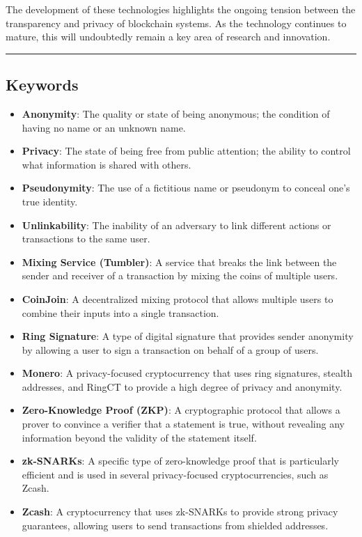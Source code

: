 The development of these technologies highlights the ongoing tension
between the transparency and privacy of blockchain systems. As the
technology continues to mature, this will undoubtedly remain a key area
of research and innovation.

\begin{center}\rule{0.5\linewidth}{0.5pt}\end{center}

\subsection{Keywords}\label{keywords}

\begin{itemize}
\tightlist
\item
  \textbf{Anonymity}: The quality or state of being anonymous; the
  condition of having no name or an unknown name.
\item
  \textbf{Privacy}: The state of being free from public attention; the
  ability to control what information is shared with others.
\item
  \textbf{Pseudonymity}: The use of a fictitious name or pseudonym to
  conceal one's true identity.
\item
  \textbf{Unlinkability}: The inability of an adversary to link
  different actions or transactions to the same user.
\item
  \textbf{Mixing Service (Tumbler)}: A service that breaks the link
  between the sender and receiver of a transaction by mixing the coins
  of multiple users.
\item
  \textbf{CoinJoin}: A decentralized mixing protocol that allows
  multiple users to combine their inputs into a single transaction.
\item
  \textbf{Ring Signature}: A type of digital signature that provides
  sender anonymity by allowing a user to sign a transaction on behalf of
  a group of users.
\item
  \textbf{Monero}: A privacy-focused cryptocurrency that uses ring
  signatures, stealth addresses, and RingCT to provide a high degree of
  privacy and anonymity.
\item
  \textbf{Zero-Knowledge Proof (ZKP)}: A cryptographic protocol that
  allows a prover to convince a verifier that a statement is true,
  without revealing any information beyond the validity of the statement
  itself.
\item
  \textbf{zk-SNARKs}: A specific type of zero-knowledge proof that is
  particularly efficient and is used in several privacy-focused
  cryptocurrencies, such as Zcash.
\item
  \textbf{Zcash}: A cryptocurrency that uses zk-SNARKs to provide strong
  privacy guarantees, allowing users to send transactions from shielded
  addresses.
\end{itemize}

